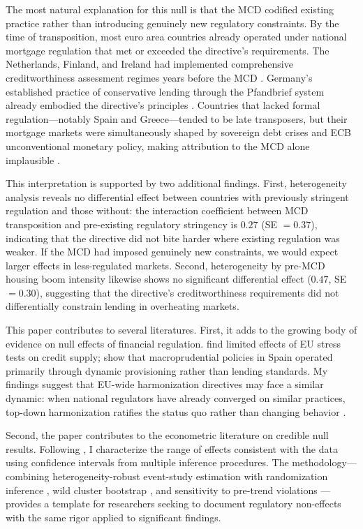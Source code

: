 \documentclass[12pt]{article}
\begin{document}
The most natural explanation for this null is that the MCD codified existing practice rather than introducing genuinely new regulatory constraints. By the time of transposition, most euro area countries already operated under national mortgage regulation that met or exceeded the directive's requirements. The Netherlands, Finland, and Ireland had implemented comprehensive creditworthiness assessment regimes years before the MCD \citep{maclennan_2018_mortgage}. Germany's established practice of conservative lending through the Pfandbrief system already embodied the directive's principles \citep{bholat_2018_mortgage}. Countries that lacked formal regulation---notably Spain and Greece---tended to be late transposers, but their mortgage markets were simultaneously shaped by sovereign debt crises and ECB unconventional monetary policy, making attribution to the MCD alone implausible \citep{cerutti_2017_macropru}.

This interpretation is supported by two additional findings. First, heterogeneity analysis reveals no differential effect between countries with previously stringent regulation and those without: the interaction coefficient between MCD transposition and pre-existing regulatory stringency is $0.27$ (SE $= 0.37$), indicating that the directive did not bite harder where existing regulation was weaker. If the MCD had imposed genuinely new constraints, we would expect larger effects in less-regulated markets. Second, heterogeneity by pre-MCD housing boom intensity likewise shows no significant differential effect ($0.47$, SE $= 0.30$), suggesting that the directive's creditworthiness requirements did not differentially constrain lending in overheating markets.

This paper contributes to several literatures. First, it adds to the growing body of evidence on null effects of financial regulation. \citet{acharya_2014_testing} find limited effects of EU stress tests on credit supply; \citet{jimenez_2017_macropru} show that macroprudential policies in Spain operated primarily through dynamic provisioning rather than lending standards. My findings suggest that EU-wide harmonization directives may face a similar dynamic: when national regulators have already converged on similar practices, top-down harmonization ratifies the status quo rather than changing behavior \citep{enriques_2015_eu_finance}.

Second, the paper contributes to the econometric literature on credible null results. Following \citet{abadie_2020_sampling}, I characterize the range of effects consistent with the data using confidence intervals from multiple inference procedures. The methodology---combining heterogeneity-robust event-study estimation \citep{sun_abraham_2021, callaway_santanna_2021} with randomization inference \citep{fisher_1935_design, young_2019_channeling}, wild cluster bootstrap \citep{cameron_2008_bootstrap, mackinnon_2022_cluster}, and sensitivity to pre-trend violations \citep{roth_2023_pretest, rambachan_roth_2023}---provides a template for researchers seeking to document regulatory non-effects with the same rigor applied to significant findings.
\end{document}
